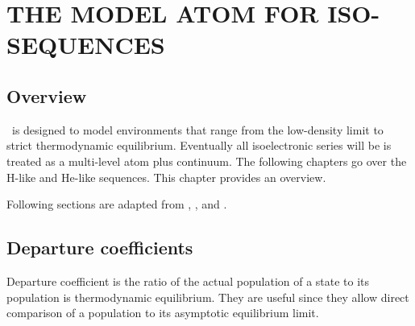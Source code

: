 \chapter{THE MODEL ATOM FOR ISO-SEQUENCES}

\section{Overview}

\Cloudy\ is designed to model environments that range from the low-density
limit to strict thermodynamic equilibrium.  Eventually all isoelectronic
series will be is treated as a multi-level atom plus continuum.   The
following chapters go over the H-like and He-like sequences.  This chapter
provides an overview.

Following sections are adapted from \citet{Ferland1988}, \citet{Ferland1989}, and \citet{FerlandPeterson1992}.

\section{Departure coefficients}

Departure coefficient is the ratio of the actual population of a state
to its population is thermodynamic equilibrium.  They are useful since they
allow direct comparison of a population to its asymptotic equilibrium limit.

